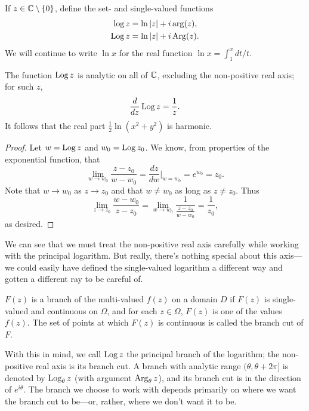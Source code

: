 \documentclass[../m136main.tex]{subfiles}
\begin{document}
\pagebreak

\begin{definition}
    If $z \in \mathbb{C} \setminus \left\{ 0 \right\}$, define the set- and single-valued functions
    \begin{align*}
        \log z &= \ln |z| + i \arg(z), \\
        \operatorname{Log} z &= \ln |z| + i \operatorname{Arg}(z).
    \end{align*}
    We will continue to write $\ln x$ for the real function $\ln x = \int_{1}^{x} dt / t$.
\end{definition}

\begin{theorem}
    The function $\operatorname{Log} z$ is analytic on all of $\mathbb{C}$, excluding the non-positive real axis; for such $z$,
    \[ \frac{d}{dz} \operatorname{Log} z = \frac{1}{z}. \]
    It follows that the real part $\frac{1}{2} \ln (x^2 + y^2)$ is harmonic.
\end{theorem}

\begin{proof}
    Let $w = \operatorname{Log} z$ and $w_0 = \operatorname{Log} z_0$.
    We know, from properties of the exponential function, that
    \[ \lim_{w \to w_0} \frac{z - z_0}{w - w_0} = \frac{dz}{dw} \Big|_{w = w_0} = e^{w_0} = z_0. \]
    Note that $w \to w_0$ as $z \to z_0$ and that $w \neq w_0$ as long as $z \neq z_0$.
    Thus
    \[ \lim_{z \to z_0} \frac{w - w_0}{z - z_0} = \lim_{w \to w_0} \frac{1}{\frac{z - z_0}{w - w_0}} = \frac{1}{z_0}, \]
    as desired.
\end{proof}

We can see that we must treat the non-positive real axis carefully while working with the principal logarithm.
But really, there's nothing special about this axis---we could easily have defined the single-valued logarithm a different way and gotten a different ray to be careful of.

\begin{definition}[Branch]
    $F(z)$ is a branch of the multi-valued $f(z)$ on a domain $D$ if $F(z)$ is single-valued and continuous on $\Omega$, and for each $z \in \Omega$, $F(z)$ is one of the values $f(z)$.
    The set of points at which $F(z)$ is continuous is called the branch cut of $F$.
\end{definition}

With this in mind, we call $\operatorname{Log} z$ the principal branch of the logarithm; the non-positive real axis is its branch cut.
A branch with analytic range $(\theta, \theta + 2\pi]$ is denoted by $\operatorname{Log}_\theta z$ (with argument $\operatorname{Arg}_\theta z$), and its branch cut is in the direction of $e^{i \theta}$.
The branch we choose to work with depends primarily on where we want the branch cut to be---or, rather, where we don't want it to be.
\end{document}
